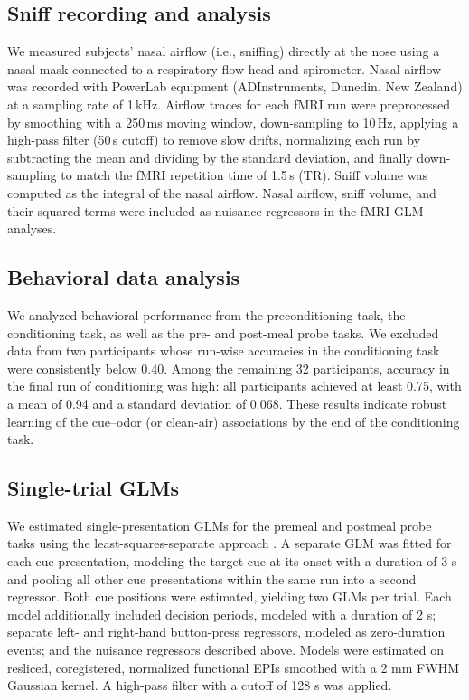 \documentclass[12pt,letterpaper]{article}
\begin{document}
\subsection*{Sniff recording and analysis}

We measured subjects’ nasal airflow (i.e., sniffing) directly at the nose using a nasal mask connected to a respiratory flow head and spirometer. Nasal airflow was recorded with PowerLab equipment (ADInstruments, Dunedin, New Zealand) at a sampling rate of 1\,kHz. Airflow traces for each fMRI run were preprocessed by smoothing with a 250\,ms moving window, down-sampling to 10\,Hz, applying a high-pass filter (50\,s cutoff) to remove slow drifts, normalizing each run by subtracting the mean and dividing by the standard deviation, and finally down-sampling to match the fMRI repetition time of 1.5\,s (TR). Sniff volume was computed as the integral of the nasal airflow. Nasal airflow, sniff volume, and their squared terms were included as nuisance regressors in the fMRI GLM analyses.


\subsection*{Behavioral data analysis}

We analyzed behavioral performance from the preconditioning task, the conditioning task, as well as the pre- and post-meal probe tasks. We excluded data from two participants whose run-wise accuracies in the conditioning task were consistently below 0.40. Among the remaining 32 participants, accuracy in the final run of conditioning was high: all participants achieved at least 0.75, with a mean of 0.94 and a standard deviation of 0.068. These results indicate robust learning of the cue–odor (or clean-air) associations by the end of the conditioning task.



\subsection*{Single-trial GLMs}


We estimated single-presentation GLMs for the premeal and postmeal probe tasks using the least-squares-separate approach \cite{mumford2012deconvolving}. A separate GLM was fitted for each cue presentation, modeling the target cue at its onset with a duration of 3 s and pooling all other cue presentations within the same run into a second regressor. Both cue positions were estimated, yielding two GLMs per trial. Each model additionally included decision periods, modeled with a duration of 2 s; separate left- and right-hand button-press regressors, modeled as zero-duration events; and the nuisance regressors described above. Models were estimated on resliced, coregistered, normalized functional EPIs smoothed with a 2 mm FWHM Gaussian kernel. A high-pass filter with a cutoff of 128 s was applied.
\end{document}
